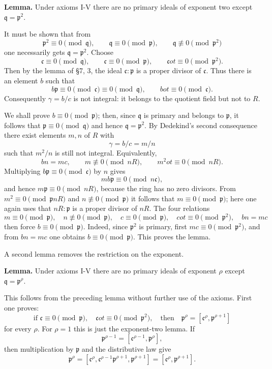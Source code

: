 \documentclass[11pt]{article}
\begin{document}
\textbf{Lemma.} Under axioms I-V there are no primary ideals of exponent
two except \(\mathfrak q=\mathfrak p^2\).

It must be shown that from \[
  \mathfrak p^2\equiv0\pmod{\mathfrak q},\qquad
  \mathfrak q\equiv0\pmod{\mathfrak p},\qquad
  \mathfrak q\not\equiv0\pmod{\mathfrak p^2}
\] one necessarily gets \(\mathfrak q=\mathfrak p^2\). Choose \[
  \mathfrak c\equiv0\pmod{\mathfrak q},\qquad
  \mathfrak c\equiv0\pmod{\mathfrak p},\qquad
  \mathfrak c
ot\equiv0\pmod{\mathfrak p^2}.
\] Then by the lemma of §7, 3, the ideal \(\mathfrak c:\mathfrak p\) is
a proper divisor of \(\mathfrak c\). Thus there is an element \(b\) such
that \[
  b\mathfrak p\equiv0\pmod{\mathfrak c}
      \equiv0\pmod{\mathfrak q},
  \qquad b
ot\equiv0\pmod{\mathfrak c}.
\] Consequently \(\gamma=b/c\) is not integral: it belongs to the
quotient field but not to \(R\).

We shall prove \(b\equiv0\pmod{\mathfrak p}\); then, since
\(\mathfrak q\) is primary and belongs to \(\mathfrak p\), it follows
that \(\mathfrak p\equiv0\pmod{\mathfrak q}\) and hence
\(\mathfrak q=\mathfrak p^2\). By Dedekind's second consequence there
exist elements \(m,n\) of \(R\) with \[
  \gamma=b/c=m/n
\] such that \(m^2/n\) is still not integral. Equivalently, \[
  bn=mc,
  \qquad m\not\equiv0\pmod{nR},
  \qquad m^2
ot\equiv0\pmod{nR}.
\] Multiplying \(b\mathfrak p\equiv0\pmod{\mathfrak c}\) by \(n\) gives
\[
  mb\mathfrak p\equiv0\pmod{n\mathfrak c},
\] and hence \(m\mathfrak p\equiv0\pmod{nR}\), because the ring has no
zero divisors. From \(m^2\equiv0\pmod{\mathfrak p nR}\) and
\(n\not\equiv0\pmod{\mathfrak p}\) it follows that
\(m\equiv0\pmod{\mathfrak p}\); here one again uses that
\(nR:\mathfrak p\) is a proper divisor of \(nR\). The four relations \[
  m\equiv0\pmod{\mathfrak p},
  \quad n\not\equiv0\pmod{\mathfrak p},
  \quad c\equiv0\pmod{\mathfrak p},
  \quad c
ot\equiv0\pmod{\mathfrak p^2},
  \quad bn=mc
\] then force \(b\equiv0\pmod{\mathfrak p}\). Indeed, since
\(\mathfrak p^2\) is primary, first \(mc\equiv0\pmod{\mathfrak p^2}\),
and from \(bn=mc\) one obtains \(b\equiv0\pmod{\mathfrak p}\). This
proves the lemma.

A second lemma removes the restriction on the exponent.

\textbf{Lemma.} Under axioms I-V there are no primary ideals of exponent
\(\rho\) except \(\mathfrak q=\mathfrak p^{\rho}\).

This follows from the preceding lemma without further use of the axioms.
First one proves: \[
  \text{if }\mathfrak c\equiv0\pmod{\mathfrak p},\quad
  \mathfrak c
ot\equiv0\pmod{\mathfrak p^2},
  \quad\text{then}\quad
  \mathfrak p^{\rho}=[\mathfrak c^{\rho},\mathfrak p^{\rho+1}]
\] for every \(\rho\). For \(\rho=1\) this is just the exponent-two
lemma. If \[
  \mathfrak p^{\rho-1}=[\mathfrak c^{\rho-1},\mathfrak p^{\rho}],
\] then multiplication by \(\mathfrak p\) and the distributive law give
\[
  \mathfrak p^{\rho}=
  [\mathfrak c^{\rho},\mathfrak c^{\rho-1}\mathfrak p^{\rho+1},\mathfrak p^{\rho+1}]
  =[
    \mathfrak c^{\rho},\mathfrak p^{\rho+1}].
\]
\end{document}
